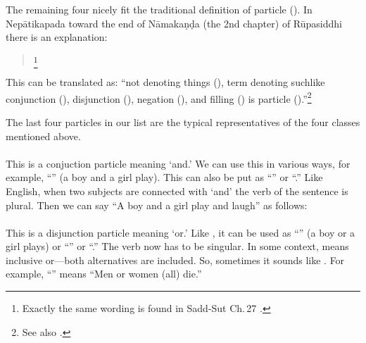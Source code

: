 The remaining four nicely fit the traditional definition of particle (). In Nep\=atikapada toward the end of N\=amaka\d n\d da (the 2nd chapter) of R\=upasiddhi there is an explanation: 

\begin{quote}
\footnote{Exactly the same wording is found in Sadd-Sut Ch.\,27 \citep[p.~886]{smith:sadd3}.} 
\end{quote}

This can be translated as: ``not denoting things (), term denoting suchlike conjunction (), disjunction (), negation (), and filling () is particle ().''\footnote{See also \citealp[pp.~121--2]{collins:grammar}.}

The last four particles in our list are the typical representatives of the four classes mentioned above.

\paragraph*{} This is a conjuction particle meaning `and.' We can use this in various ways, for example, ``'' (a boy and a girl play). This can also be put as ``'' or ``.'' Like English, when two subjects are connected with `and' the verb of the sentence is plural. Then we can say ``A boy and a girl play and laugh'' as follows:


\paragraph{} This is a disjunction particle meaning `or.' Like , it can be used as ``'' (a boy or a girl plays) or ``'' or ``.'' The verb now has to be singular. In some context,  means inclusive or---both alternatives are included. So, sometimes it sounds like . For example, ``'' means ``Men or women (all) die.''

